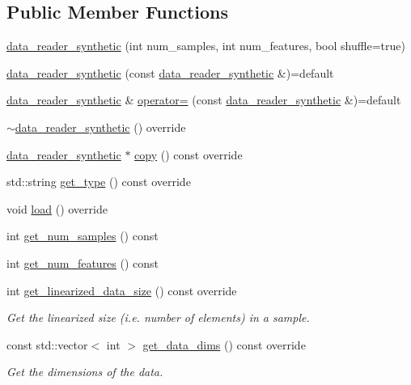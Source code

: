 \subsection*{Public Member Functions}
\begin{DoxyCompactItemize}
\item 
\hyperlink{classlbann_1_1data__reader__synthetic_a9d1cf28b223c11e4fdc776b0d364685d}{data\+\_\+reader\+\_\+synthetic} (int num\+\_\+samples, int num\+\_\+features, bool shuffle=true)
\item 
\hyperlink{classlbann_1_1data__reader__synthetic_a5c6af71af9357bb7b877f1a04600824a}{data\+\_\+reader\+\_\+synthetic} (const \hyperlink{classlbann_1_1data__reader__synthetic}{data\+\_\+reader\+\_\+synthetic} \&)=default
\item 
\hyperlink{classlbann_1_1data__reader__synthetic}{data\+\_\+reader\+\_\+synthetic} \& \hyperlink{classlbann_1_1data__reader__synthetic_a7507d28c3a06b11e0abc90facf31924a}{operator=} (const \hyperlink{classlbann_1_1data__reader__synthetic}{data\+\_\+reader\+\_\+synthetic} \&)=default
\item 
\hyperlink{classlbann_1_1data__reader__synthetic_a531fdd2a528b336c6c58cbb178b4e37d}{$\sim$data\+\_\+reader\+\_\+synthetic} () override
\item 
\hyperlink{classlbann_1_1data__reader__synthetic}{data\+\_\+reader\+\_\+synthetic} $\ast$ \hyperlink{classlbann_1_1data__reader__synthetic_a9d7ef789329af4b2a96326ac88803f9e}{copy} () const override
\item 
std\+::string \hyperlink{classlbann_1_1data__reader__synthetic_a4093c7f0b76b3c8df2980c6b7b13e163}{get\+\_\+type} () const override
\item 
void \hyperlink{classlbann_1_1data__reader__synthetic_a0c57b7ff8fcb0c700fd412a9ee29dc28}{load} () override
\item 
int \hyperlink{classlbann_1_1data__reader__synthetic_aeff787c926f22d8df12304b106c4699c}{get\+\_\+num\+\_\+samples} () const
\item 
int \hyperlink{classlbann_1_1data__reader__synthetic_aced84d4619326d4100871bcc7773c41a}{get\+\_\+num\+\_\+features} () const
\item 
int \hyperlink{classlbann_1_1data__reader__synthetic_a0eea15c5697e7e7dfd0abaccff3fc2c3}{get\+\_\+linearized\+\_\+data\+\_\+size} () const override
\begin{DoxyCompactList}\small\item\em Get the linearized size (i.\+e. number of elements) in a sample. \end{DoxyCompactList}\item 
const std\+::vector$<$ int $>$ \hyperlink{classlbann_1_1data__reader__synthetic_a5ee6a8ee02a6ff788988ae427ccf4aa5}{get\+\_\+data\+\_\+dims} () const override
\begin{DoxyCompactList}\small\item\em Get the dimensions of the data. \end{DoxyCompactList}\end{DoxyCompactItemize}
